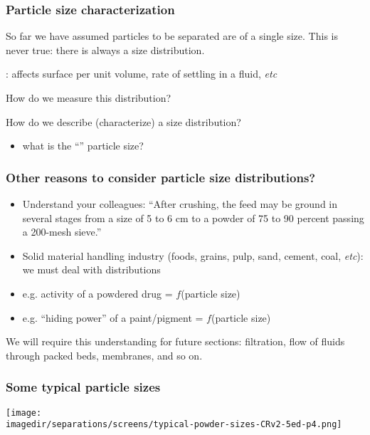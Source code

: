 \begin{frame}\frametitle{Particle size characterization}
	So far we have assumed particles to be separated are of a single size. This is never true: there is always a size distribution.
	
	\vspace{12pt}
	{\color{myGreen}{Particle size}}: affects surface per unit volume, rate of settling in a fluid, \emph{etc}
	
	\vspace{12pt}	
	\begin{exampleblock}{{\color{myRed}{Aims}}}
		\vspace{12pt}
		How do we measure this distribution?
		
		\vspace{12pt}
		How do we describe (characterize) a size distribution? 
	\end{exampleblock}
	\begin{itemize}
		\item	what is the ``\textbf{{\color{Brown}{average}}}'' particle size?
	\end{itemize}
\end{frame}

\begin{frame}\frametitle{Other reasons to consider particle size distributions?}
	\begin{itemize}
		\item	Understand your colleagues: ``After crushing, the feed may be ground in several stages from a size of 5 to 6 cm to a powder of 75 to 90 percent passing a 200-mesh sieve.''
		\item	Solid material handling industry (foods, grains, pulp, sand, cement, coal, \emph{etc}): we must deal with distributions 
		\item	e.g. activity of a powdered drug = $f$(particle size)
		\item	e.g. ``hiding power'' of a paint/pigment = $f$(particle size)
	\end{itemize}
	
	\vspace{12pt}
	\begin{exampleblock}{}
		We will require this understanding for future sections: filtration, flow of fluids through packed beds, membranes, and so on.
	\end{exampleblock}
\end{frame}

\begin{frame}\frametitle{Some typical particle sizes}
	\begin{center}
		\texttt{[image: \\imagedir/separations/screens/typical-powder-sizes-CRv2-5ed-p4.png]}
	\end{center}
\end{frame}

